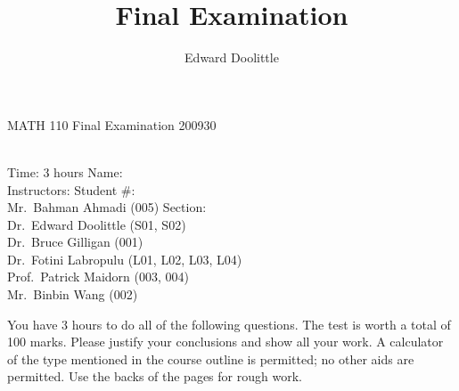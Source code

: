 \documentclass[12pt,legalpaper]{article}
\title{Final Examination}
\author{Edward Doolittle}
\begin{document}
\thispagestyle{plain}

\begin{center}
  \LARGE{MATH 110 Final Examination 200930}
\end{center}

\begin{flushleft}
\quad\\
Time:  3 hours                    \hfill       Name: \underline{\hspace{2in}} \\
Instructors:                      \hfill Student \#: \underline{\hspace{2in}} \\
\quad Mr.\ Bahman Ahmadi (005)    \hfill    Section: \underline{\hspace{2in}} \\
\quad Dr.\ Edward Doolittle (S01, S02)           \hfill    \\
\quad Dr.\ Bruce Gilligan (001)                  \hfill    \\
\quad Dr.\ Fotini Labropulu (L01, L02, L03, L04) \hfill    \\
\quad Prof.\ Patrick Maidorn (003, 004)          \hfill    \\
\quad Mr.\ Binbin Wang (002)                     \hfill    \\
\end{flushleft}


\noindent
You have 3 hours to do all of the following questions.
The test is worth a total of 100 marks.
Please 
justify your conclusions and
show all your work.
A calculator of the type mentioned in the course outline
is permitted; no other aids are permitted.
Use the backs of the pages for rough work.
\end{document}
